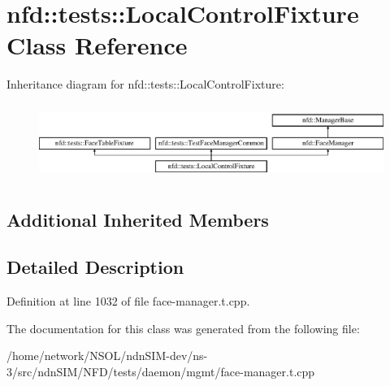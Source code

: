 \hypertarget{classnfd_1_1tests_1_1LocalControlFixture}{}\section{nfd\+:\+:tests\+:\+:Local\+Control\+Fixture Class Reference}
\label{classnfd_1_1tests_1_1LocalControlFixture}
Inheritance diagram for nfd\+:\+:tests\+:\+:Local\+Control\+Fixture\+:\begin{figure}[H]
\begin{center}
\leavevmode
\includegraphics[height=2.477876cm]{classnfd_1_1tests_1_1LocalControlFixture}
\end{center}
\end{figure}
\subsection*{Additional Inherited Members}


\subsection{Detailed Description}


Definition at line 1032 of file face-\/manager.\+t.\+cpp.



The documentation for this class was generated from the following file\+:\begin{DoxyCompactItemize}
\item 
/home/network/\+N\+S\+O\+L/ndn\+S\+I\+M-\/dev/ns-\/3/src/ndn\+S\+I\+M/\+N\+F\+D/tests/daemon/mgmt/face-\/manager.\+t.\+cpp\end{DoxyCompactItemize}
